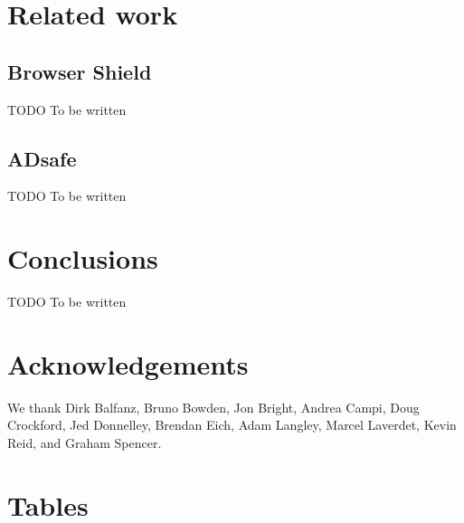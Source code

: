 \documentclass[letterpaper,twocolumn,10pt]{article}
\begin{document}
\section{Related work}
\label{sec:related}

\subsection{Browser Shield}

TODO To be written

\subsection{ADsafe}

TODO To be written

\section{Conclusions}

TODO To be written

\section{Acknowledgements}

We thank 
Dirk Balfanz,
Bruno Bowden,
Jon Bright,
Andrea Campi,
Doug Crockford,
Jed Donnelley,
Brendan Eich,
Adam Langley,
Marcel Laverdet,
Kevin Reid,
and
Graham Spencer.

\appendix

\section{Tables}
\end{document}
